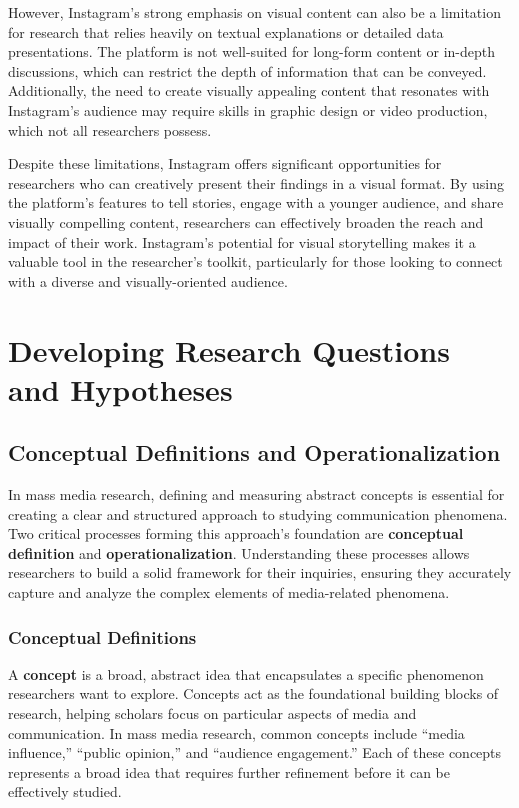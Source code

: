 \documentclass[
]{book}
\begin{document}
However, Instagram's strong emphasis on visual content can also be a limitation for research that relies heavily on textual explanations or detailed data presentations. The platform is not well-suited for long-form content or in-depth discussions, which can restrict the depth of information that can be conveyed. Additionally, the need to create visually appealing content that resonates with Instagram's audience may require skills in graphic design or video production, which not all researchers possess.

Despite these limitations, Instagram offers significant opportunities for researchers who can creatively present their findings in a visual format. By using the platform's features to tell stories, engage with a younger audience, and share visually compelling content, researchers can effectively broaden the reach and impact of their work. Instagram's potential for visual storytelling makes it a valuable tool in the researcher's toolkit, particularly for those looking to connect with a diverse and visually-oriented audience.

\chapter{Developing Research Questions and Hypotheses}\label{developing-research-questions-and-hypotheses}

\section{Conceptual Definitions and Operationalization}\label{conceptual-definitions-and-operationalization}

In mass media research, defining and measuring abstract concepts is essential for creating a clear and structured approach to studying communication phenomena. Two critical processes forming this approach's foundation are \textbf{conceptual definition} and \textbf{operationalization}. Understanding these processes allows researchers to build a solid framework for their inquiries, ensuring they accurately capture and analyze the complex elements of media-related phenomena.

\subsection*{Conceptual Definitions}\label{conceptual-definitions}

A \textbf{concept} is a broad, abstract idea that encapsulates a specific phenomenon researchers want to explore. Concepts act as the foundational building blocks of research, helping scholars focus on particular aspects of media and communication. In mass media research, common concepts include ``media influence,'' ``public opinion,'' and ``audience engagement.'' Each of these concepts represents a broad idea that requires further refinement before it can be effectively studied.
\end{document}
